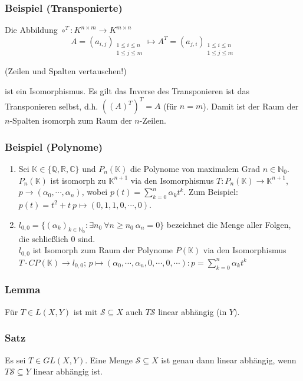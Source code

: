 \subsubsection{Beispiel (Transponierte)}
Die Abbildung $\circ ^T:K^{n\times m}\rightarrow K^{m\times n}$
\[ A=(a_{i,j})_{\substack{1\leq i\leq n\\ 1\leq j\leq m}} \mapsto A^T =(a_{j,i})_{\substack{1\leq i\leq n\\ 1\leq j\leq m}}\]
\begin{center}
(Zeilen und Spalten vertauschen!)
\end{center}
ist ein Isomorphismus.  Es gilt das Inverse des Transponieren ist das Transponieren selbst, d.h. $((A)^T)^T=A$ (für $n=m$).  Damit ist der Raum der $n$-Spalten isomorph zum Raum der $n$-Zeilen.
\subsubsection{Beispiel (Polynome)}
\renewcommand{\labelenumi}{(\arabic{enumi})}
\begin{enumerate}
\item Sei $\mathbb{K}\in \{\mathbb{Q},\mathbb{R},\mathbb{C}\}$ und $P_n(\mathbb{K})$ die Polynome von maximalem Grad $n\in \mathbb{N}_0$. $P_n(\mathbb{K})$ ist isomorph zu $\mathbb{K}^{n+1}$ via den Isomorphismus $T: P_n(\mathbb{K})\rightarrow \mathbb{K}^{n+1}$, $p\rightarrow (\alpha _0,\cdots ,\alpha _n)$, wobei $p(t)=\sum_{k=0}^n\alpha _kt^k$. Zum Beispiel: $p(t)=t^2+t\ p\mapsto (0,1,1, 0,\cdots ,0)$.
\item $l_{0,0}=\{(\alpha _k)_{k\in \mathbb{N}_0}:\exists n_0\ \forall n\geq n_0\ \alpha _n=0\}$ bezeichnet die Menge aller Folgen, die schließlich $0$ sind.\\
$l_{0,0}$ ist Isomorph zum Raum der Polynome $P(\mathbb{K})$ via den Isomorphismus $T\cdot C P(\mathbb{K})\rightarrow l_{0,0}$; $p\mapsto (\alpha _0,\cdots ,\alpha _n,0,\cdots, 0,\cdots ): p=\sum_{k=0}^n\alpha _kt^k$
\end{enumerate}
\subsubsection{Lemma}
Für $T\in L(X,Y)$ ist mit $\mathcal{S}\subseteq X$ auch $T\mathcal{S}$ linear abhängig (in $Y$).
\subsubsection{Satz}
Es sei $T\in GL(X,Y)$.  Eine Menge $\mathcal{S}\subseteq X$ ist genau dann linear abhängig, wenn $T\mathcal{S}\subseteq Y$ linear abhängig ist.
